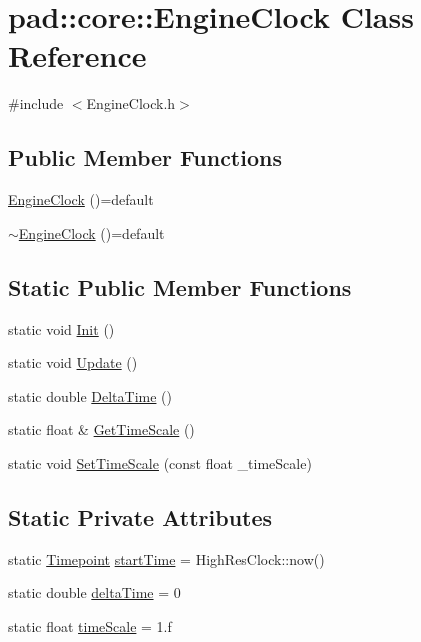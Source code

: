 \hypertarget{classpad_1_1core_1_1_engine_clock}{}\section{pad\+:\+:core\+:\+:Engine\+Clock Class Reference}
\label{classpad_1_1core_1_1_engine_clock}


{\ttfamily \#include $<$Engine\+Clock.\+h$>$}

\subsection*{Public Member Functions}
\begin{DoxyCompactItemize}
\item 
\mbox{\hyperlink{classpad_1_1core_1_1_engine_clock_a0f5e9a19f7fa98ddd9caa0b9c51cfda0}{Engine\+Clock}} ()=default
\item 
\mbox{\hyperlink{classpad_1_1core_1_1_engine_clock_a79921c10e211993b0334ad49d5a8a9d6}{$\sim$\+Engine\+Clock}} ()=default
\end{DoxyCompactItemize}
\subsection*{Static Public Member Functions}
\begin{DoxyCompactItemize}
\item 
static void \mbox{\hyperlink{classpad_1_1core_1_1_engine_clock_aa875a10323ebe063b17f7e257286194c}{Init}} ()
\item 
static void \mbox{\hyperlink{classpad_1_1core_1_1_engine_clock_a790635e126f52744162f047aafdb7bcf}{Update}} ()
\item 
static double \mbox{\hyperlink{classpad_1_1core_1_1_engine_clock_a1ba2486ae11fce384c980e2ba291c927}{Delta\+Time}} ()
\item 
static float \& \mbox{\hyperlink{classpad_1_1core_1_1_engine_clock_a695b9f114e8345ee34d4a720d0983528}{Get\+Time\+Scale}} ()
\item 
static void \mbox{\hyperlink{classpad_1_1core_1_1_engine_clock_a1d6fe825cfffb304f886a2fbaae1bff9}{Set\+Time\+Scale}} (const float \+\_\+time\+Scale)
\end{DoxyCompactItemize}
\subsection*{Static Private Attributes}
\begin{DoxyCompactItemize}
\item 
static \mbox{\hyperlink{namespacepad_1_1core_a4359864da05f393ed6e69d9d018946ad}{Timepoint}} \mbox{\hyperlink{classpad_1_1core_1_1_engine_clock_a80732fd3767d4fdf18bac6d81fdf7e63}{start\+Time}} = High\+Res\+Clock\+::now()
\item 
static double \mbox{\hyperlink{classpad_1_1core_1_1_engine_clock_aa72d74511b2e44787d4d45a8fcbb0dd7}{delta\+Time}} = 0
\item 
static float \mbox{\hyperlink{classpad_1_1core_1_1_engine_clock_afb71f5ea4e8788c7b8d95a798347f642}{time\+Scale}} = 1.f
\end{DoxyCompactItemize}



